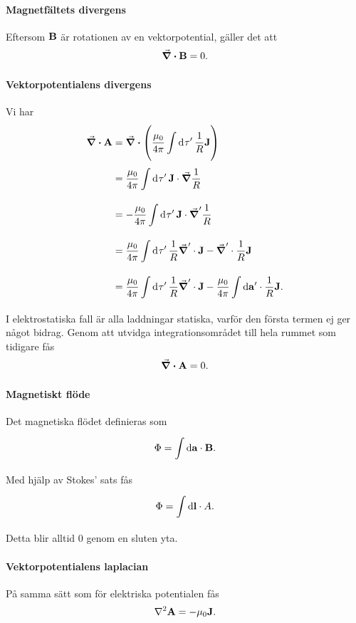 \paragraph{Magnetfältets divergens}
Eftersom $\vb{B}$ är rotationen av en vektorpotential, gäller det att
\begin{align*}
	\div{\vb{B}} = 0.
\end{align*}

\paragraph{Vektorpotentialens divergens}
Vi har
\begin{align*}
	\div{\vb{A}} &= \div(\frac{\mu_{0}}{4\pi}\int\limits_{}^{}\dd[]{\tau'}\frac{1}{R}\vb{J}) \\
	             &= \frac{\mu_{0}}{4\pi}\int\limits_{}^{}\dd[]{\tau'}\vb{J}\cdot\grad{\frac{1}{R}} \\
	             &= -\frac{\mu_{0}}{4\pi}\int\limits_{}^{}\dd[]{\tau'}\vb{J}\cdot\grad^{\prime}{\frac{1}{R}} \\
	             &= \frac{\mu_{0}}{4\pi}\int\limits_{}^{}\dd[]{\tau'}\frac{1}{R}\grad^{\prime}\cdot{\vb{J}} - \grad^{\prime}\cdot{\frac{1}{R}\vb{J}} \\
	             &= \frac{\mu_{0}}{4\pi}\int\limits_{}^{}\dd[]{\tau'}\frac{1}{R}\grad^{\prime}\cdot{\vb{J}} -  \frac{\mu_{0}}{4\pi}\int\limits_{}^{}\dd{\vb{a'}}\cdot \frac{1}{R}\vb{J}.
\end{align*}
I elektrostatiska fall är alla laddningar statiska, varför den första termen ej ger något bidrag. Genom att utvidga integrationsområdet till hela rummet som tidigare fås
\begin{align*}
	\div{\vb{A}} = 0.
\end{align*}

\paragraph{Magnetiskt flöde}
Det magnetiska flödet definieras som
\begin{align*}
	\Phi = \int\limits_{}^{}\dd{\vb{a}}\cdot \vb{B}.
\end{align*}
Med hjälp av Stokes' sats fås
\begin{align*}
	\Phi = \int\limits_{}^{}\dd{\vb{l}}\cdot A.
\end{align*}
Detta blir alltid $0$ genom en sluten yta.

\paragraph{Vektorpotentialens laplacian}
På samma sätt som för elektriska potentialen fås
\begin{align*}
	\laplacian{\vb{A}} = -\mu_{0}\vb{J}.
\end{align*}


